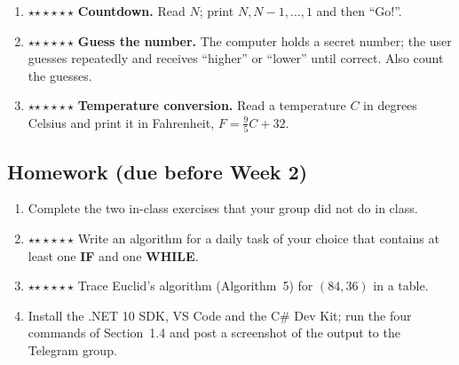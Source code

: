 \documentclass[11pt,a4paper]{article}
\newif\ifsolutions
\newcommand{\READ}{\textbf{READ}\ }
\newcommand{\PRINT}{\textbf{PRINT}\ }
\newcommand{\START}{\State \textbf{START}}
\newcommand{\STOP}{\State \textbf{END}}
\newcommand{\MOD}{\mathbin{\mathrm{mod}}}
\newcommand{\str}[1]{\texttt{"#1"}}
\newcommand{\solution}[1]{\ifsolutions\begin{solbox}#1\end{solbox}\fi}
\newcommand{\stars}[1]{\textcolor{amberdk}{\ifcase#1\or$\star$\or$\star\star$\or$\star\star\star$\fi}}
\begin{document}
\begin{enumerate}[label=\textbf{\Alph*.},leftmargin=*,itemsep=3pt]
  \item \stars{1} \textbf{Countdown.} Read $N$; print $N, N-1, \dots, 1$ and then ``Go!''.
  \solution{
  \begin{algorithmic}[1]
  \START \State \READ $N$
  \WhileX{$N \ge 1$} \State \PRINT $N$ \State $N \gets N - 1$ \EndWhileX
  \State \PRINT \str{Go!} \STOP
  \end{algorithmic}
  Trace $N=3$: prints $3,2,1$, Go!. Edge case $N=0$: prints only ``Go!''.}

  \item \stars{2} \textbf{Guess the number.} The computer holds a secret number; the user guesses repeatedly and receives ``higher'' or ``lower'' until correct. Also count the guesses.
  \solution{
  \begin{algorithmic}[1]
  \START \State $secret \gets$ a number between 1 and 100 \State $count \gets 0$ \State $guess \gets 0$
  \WhileX{$guess \ne secret$}
    \State \READ $guess$ \State $count \gets count + 1$
    \IfX{$guess < secret$} \State \PRINT \str{higher}
    \ElseX \IfX{$guess > secret$} \State \PRINT \str{lower} \EndIfX \EndIfX
  \EndWhileX
  \State \PRINT \str{correct after}, $count$, \str{guesses} \STOP
  \end{algorithmic}
  $guess$ is initialised to $0$ (outside the range) so that the loop runs at least once. In C\# this is a natural \texttt{do-while} (Week~7).}

  \item \stars{1} \textbf{Temperature conversion.} Read a temperature $C$ in degrees Celsius and print it in Fahrenheit, $F = \frac{9}{5}C + 32$.
  \solution{Sequence only: \READ $C$;\ $F \gets C \times 9/5 + 32$;\ \PRINT $F$. Tests: $0\to 32$, $100\to 212$, $-40\to -40$ (the two scales meet at $-40$).}
\end{enumerate}

\subsection{Homework (due before Week 2)}
\begin{enumerate}[label=\textbf{H\arabic*.},leftmargin=*,itemsep=3pt]
  \item Complete the two in-class exercises that your group did not do in class.
  \item \stars{1} Write an algorithm for a daily task of your choice that contains at least one \textbf{IF} and one \textbf{WHILE}.
  \item \stars{1} Trace Euclid's algorithm (Algorithm~5) for $(84, 36)$ in a table.
  \solution{$84 \MOD 36 = 12$; $36 \MOD 12 = 0$; so $\gcd(84,36)=12$ after two passes.}
  \item Install the .NET 10 SDK, VS Code and the C\# Dev Kit; run the four commands of Section~1.4 and post a screenshot of the output to the Telegram group.
\end{enumerate}
\end{document}
